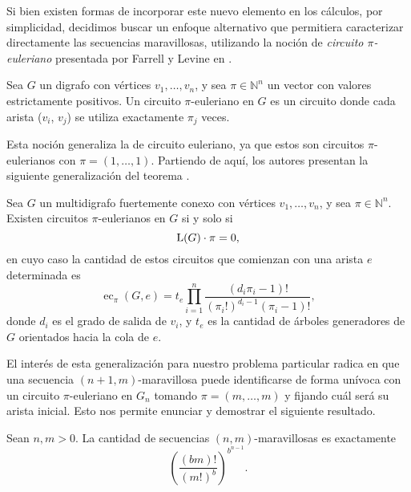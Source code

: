 Si bien existen formas de incorporar este nuevo elemento en los cálculos,
por simplicidad, decidimos buscar un enfoque alternativo que
permitiera caracterizar directamente las secuencias maravillosas, utilizando la
noción de \emph{circuito $\pi$-euleriano} presentada por Farrell y Levine en
\cite{farrell-multi-eulerian-tours}.

\begin{definition}
	Sea $G$ un digrafo con vértices $v_1, \dots, v_n$, y sea $\pi \in
		\mathbb{N}^n$
	un vector con valores estrictamente positivos.
	Un circuito $\pi$-euleriano en $G$ es un circuito donde cada arista
	($v_i$, $v_j$) se utiliza exactamente $\pi_j$ veces.
\end{definition}

Esta noción generaliza la de circuito euleriano, ya que estos son circuitos
$\pi$-eulerianos con $\pi = (1, \dots, 1)$.
Partiendo de aquí, los autores presentan la siguiente generalización del
teorema \BEST{}.

\begin{theorem*}
	\label{prop:BEST-generalized}
	Sea $G$ un multidigrafo fuertemente conexo con vértices $v_1, \dots, v_n$, y
	sea $\pi \in \mathbb{N}^n$.
	Existen circuitos $\pi$-eulerianos en $G$ si y solo si
	\[ \operatorname{L}(G) \cdot \pi = 0, \]
	en cuyo caso la cantidad de estos circuitos que comienzan con una arista $e$
	determinada es
	\[ \operatorname{ec}_\pi(G, e) = t_e
		\prod_{i=1}^n \frac{(d_i\pi_i - 1)! }{(\pi_i!)^{d_i-1}(\pi_i-1)!}, \]
	donde $d_i$ es el grado de salida de $v_i$, y $t_e$ es la cantidad de árboles
	generadores de $G$ orientados hacia la cola de $e$.
\end{theorem*}

El interés de esta generalización para nuestro problema particular radica en que
una secuencia $(n+1,m)$-maravillosa puede identificarse de forma unívoca con un
circuito $\pi$-euleriano en $G_n$ tomando $\pi = (m,\dots,m)$ y fijando cuál
será su arista inicial.
Esto nos permite enunciar y demostrar el siguiente resultado.

\begin{proposition}
	\label{proposition:marvellous-count}
	Sean $n, m > 0$.
	La cantidad de secuencias $(n,m)$-maravillosas es exactamente
	\[ \left( \frac{(bm)! }{(m!)^b} \right)^{b^{n-1}}. \]
\end{proposition}

